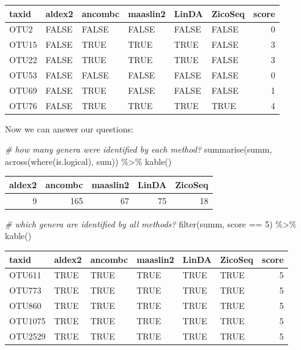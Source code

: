 \documentclass[
]{book}
\newenvironment{Shaded}{\begin{snugshade}}{\end{snugshade}}
\newcommand{\CommentTok}[1]{\textcolor[rgb]{0.56,0.35,0.01}{\textit{#1}}}
\newcommand{\DecValTok}[1]{\textcolor[rgb]{0.00,0.00,0.81}{#1}}
\newcommand{\FunctionTok}[1]{\textcolor[rgb]{0.00,0.00,0.00}{#1}}
\newcommand{\NormalTok}[1]{#1}
\newcommand{\SpecialCharTok}[1]{\textcolor[rgb]{0.00,0.00,0.00}{#1}}
\begin{document}
\begin{tabular}{l|l|l|l|l|l|r}
\hline
taxid & aldex2 & ancombc & maaslin2 & LinDA & ZicoSeq & score\\
\hline
OTU2 & FALSE & FALSE & FALSE & FALSE & FALSE & 0\\
\hline
OTU15 & FALSE & TRUE & TRUE & TRUE & FALSE & 3\\
\hline
OTU22 & FALSE & TRUE & TRUE & TRUE & FALSE & 3\\
\hline
OTU53 & FALSE & FALSE & FALSE & FALSE & FALSE & 0\\
\hline
OTU69 & FALSE & TRUE & FALSE & FALSE & FALSE & 1\\
\hline
OTU76 & FALSE & TRUE & TRUE & TRUE & TRUE & 4\\
\hline
\end{tabular}

Now we can answer our questions:

\begin{Shaded}
\begin{Highlighting}[]
\CommentTok{\# how many genera were identified by each method?}
\FunctionTok{summarise}\NormalTok{(summ, }\FunctionTok{across}\NormalTok{(}\FunctionTok{where}\NormalTok{(is.logical), sum)) }\SpecialCharTok{\%\textgreater{}\%}
  \FunctionTok{kable}\NormalTok{()}
\end{Highlighting}
\end{Shaded}

\begin{tabular}{r|r|r|r|r}
\hline
aldex2 & ancombc & maaslin2 & LinDA & ZicoSeq\\
\hline
9 & 165 & 67 & 75 & 18\\
\hline
\end{tabular}

\begin{Shaded}
\begin{Highlighting}[]
\CommentTok{\# which genera are identified by all methods?}
\FunctionTok{filter}\NormalTok{(summ, score }\SpecialCharTok{==} \DecValTok{5}\NormalTok{) }\SpecialCharTok{\%\textgreater{}\%} \FunctionTok{kable}\NormalTok{()}
\end{Highlighting}
\end{Shaded}

\begin{tabular}{l|l|l|l|l|l|r}
\hline
taxid & aldex2 & ancombc & maaslin2 & LinDA & ZicoSeq & score\\
\hline
OTU611 & TRUE & TRUE & TRUE & TRUE & TRUE & 5\\
\hline
OTU773 & TRUE & TRUE & TRUE & TRUE & TRUE & 5\\
\hline
OTU860 & TRUE & TRUE & TRUE & TRUE & TRUE & 5\\
\hline
OTU1075 & TRUE & TRUE & TRUE & TRUE & TRUE & 5\\
\hline
OTU2529 & TRUE & TRUE & TRUE & TRUE & TRUE & 5\\
\hline
\end{tabular}
\end{document}
